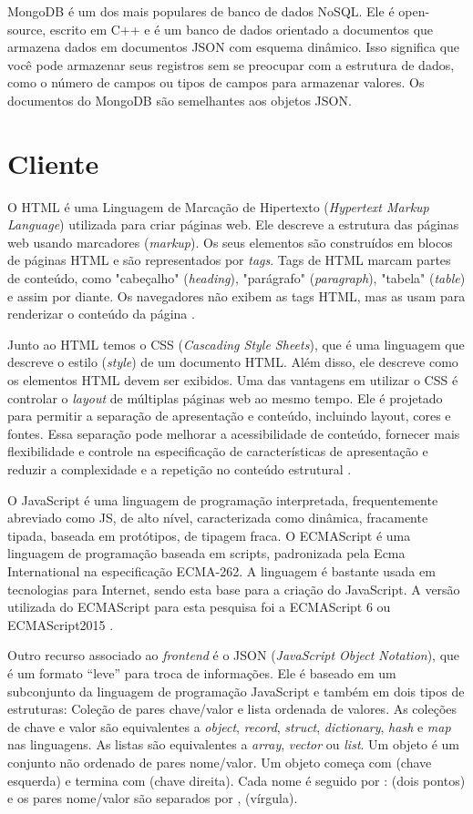 MongoDB é um dos mais populares de banco de dados NoSQL. Ele é open-source, escrito em C++ e é um banco de dados orientado a documentos que armazena dados em documentos JSON com esquema dinâmico. Isso significa que você pode armazenar seus registros sem se preocupar com a estrutura de dados, como o número de campos ou tipos de campos para armazenar valores. Os documentos do MongoDB são semelhantes aos objetos JSON.

\section{Cliente}

O HTML é uma Linguagem de Marcação de Hipertexto (\textit{Hypertext Markup Language}) utilizada para criar páginas web. Ele descreve a estrutura das páginas web usando marcadores (\textit{markup}). Os seus elementos são construídos em blocos de páginas HTML e são representados por \textit{tags}. Tags de HTML marcam partes de conteúdo, como "cabeçalho" (\textit{heading}), "parágrafo" (\textit{paragraph}), "tabela" (\textit{table}) e assim por diante. Os navegadores não exibem as tags HTML, mas as usam para renderizar o conteúdo da página \cite{html}.

 Junto ao HTML temos o CSS (\textit{Cascading Style Sheets}), que é uma linguagem que descreve o estilo (\textit{style}) de um documento HTML. Além disso, ele descreve como os elementos HTML devem ser exibidos. Uma das vantagens em utilizar o CSS é controlar o \textit{layout} de múltiplas páginas web ao mesmo tempo. Ele é projetado para permitir a separação de apresentação e conteúdo, incluindo layout, cores e fontes. Essa separação pode melhorar a acessibilidade de conteúdo, fornecer mais flexibilidade e controle na especificação de características de apresentação e reduzir a complexidade e a repetição no conteúdo estrutural \cite{css}.

O JavaScript é uma linguagem de programação interpretada, frequentemente abreviado como JS, de alto nível, caracterizada como dinâmica, fracamente tipada, baseada em protótipos, de tipagem fraca.
O ECMAScript é uma linguagem de programação baseada em scripts, padronizada pela Ecma International na especificação ECMA-262. A linguagem é bastante usada em tecnologias para Internet, sendo esta base para a criação do JavaScript. A versão utilizada do ECMAScript para esta pesquisa foi a ECMAScript 6 ou ECMAScript2015 \cite{ecma2015}.

Outro recurso associado ao \textit{frontend} é o JSON (\textit{JavaScript Object Notation}), que é um formato “leve” para troca de informações. Ele é baseado em um subconjunto da linguagem de programação JavaScript \cite{json} e também em dois tipos de estruturas: Coleção de pares chave/valor e lista ordenada de valores. As coleções de chave e valor são equivalentes a \textit{object}, \textit{record}, \textit{struct}, \textit{dictionary}, \textit{hash} e \textit{map} nas linguagens. As listas são equivalentes a \textit{array}, \textit{vector} ou \textit{list}.
Um objeto é um conjunto não ordenado de pares nome/valor. Um objeto começa com { (chave esquerda) e termina com } (chave direita). Cada nome é seguido por : (dois pontos) e os pares nome/valor são separados por , (vírgula).

